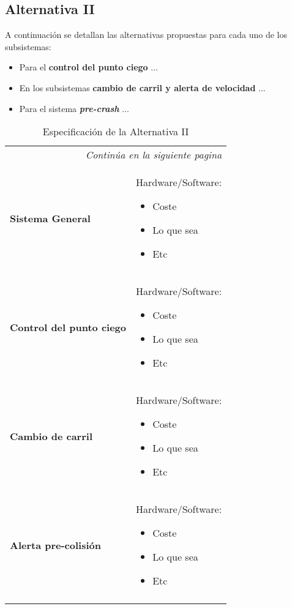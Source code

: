 \subsection{Alternativa II}

\par A continuación se detallan las alternativas propuestas para cada uno de los subsistemas:

\begin{itemize}[-]
    \item Para el \textbf{control del punto ciego} ...
    \item En los subsistemas \textbf{cambio de carril y alerta de velocidad} ...
    \item Para el sistema \textbf{\textit{pre-crash}} ...
\end{itemize}

\begin{center}
\begin{longtable}{p{5cm} p{8cm}}

\hline
\endfirsthead
\hline
\endhead

\hline \multicolumn{2}{r}{\textit{Continúa en la siguiente pagina}} \\
\endfoot
\hline
\endlastfoot

\textbf{Sistema General} &
Hardware/Software:
\begin{itemize}
    \item Coste
    \item Lo que sea
    \item Etc
\end{itemize}
\\ \hline

\textbf{Control del punto ciego} &
Hardware/Software:
\begin{itemize}
    \item Coste
    \item Lo que sea
    \item Etc
\end{itemize}
\\ \hline

\textbf{Cambio de carril} &
Hardware/Software:
\begin{itemize}
    \item Coste
    \item Lo que sea
    \item Etc
\end{itemize}
\\ \hline

\textbf{Alerta pre-colisión} &
Hardware/Software:
\begin{itemize}
    \item Coste
    \item Lo que sea
    \item Etc
\end{itemize}

\\
\caption{Especificación de la Alternativa II}
\label{tab:altII}
\end{longtable}
\end{center}
